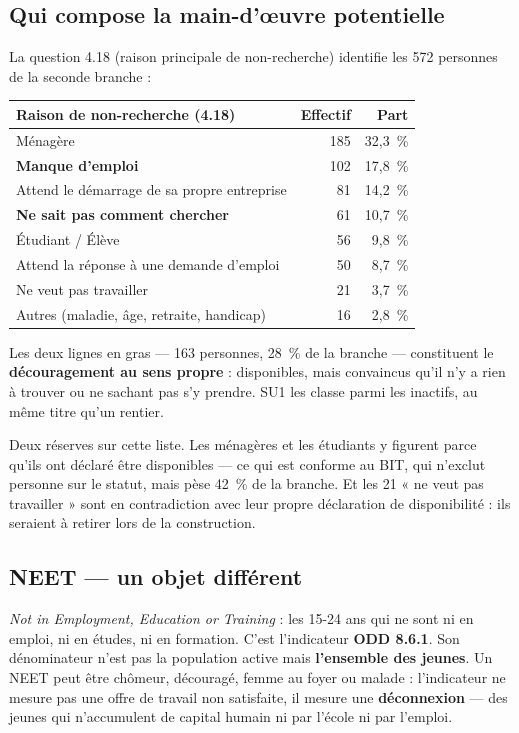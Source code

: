 \documentclass[11pt,a4paper]{article}
\begin{document}
\subsection{Qui compose la main-d'\oe uvre potentielle}

La question 4.18 (raison principale de non-recherche) identifie les 572 personnes de la seconde
branche :

\begin{center}
\small
\begin{tabular}{@{}lrr@{}}
\toprule
\textbf{Raison de non-recherche (4.18)} & \textbf{Effectif} & \textbf{Part} \\
\midrule
Ménagère & 185 & 32,3~\% \\
\textbf{Manque d'emploi} & 102 & 17,8~\% \\
Attend le démarrage de sa propre entreprise & 81 & 14,2~\% \\
\textbf{Ne sait pas comment chercher} & 61 & 10,7~\% \\
Étudiant / Élève & 56 & 9,8~\% \\
Attend la réponse à une demande d'emploi & 50 & 8,7~\% \\
Ne veut pas travailler & 21 & 3,7~\% \\
Autres (maladie, âge, retraite, handicap) & 16 & 2,8~\% \\
\bottomrule
\end{tabular}
\end{center}

Les deux lignes en gras --- 163 personnes, 28~\% de la branche --- constituent le
\textbf{découragement au sens propre} : disponibles, mais convaincus qu'il n'y a rien à trouver ou
ne sachant pas s'y prendre. SU1 les classe parmi les inactifs, au même titre qu'un rentier.

Deux réserves sur cette liste. Les ménagères et les étudiants y figurent parce qu'ils ont déclaré
être disponibles --- ce qui est conforme au BIT, qui n'exclut personne sur le statut, mais pèse
42~\% de la branche. Et les 21 « ne veut pas travailler » sont en contradiction avec leur propre
déclaration de disponibilité : ils seraient à retirer lors de la construction.

\subsection{NEET --- un objet différent}

\emph{Not in Employment, Education or Training} : les 15-24 ans qui ne sont ni en emploi, ni en
études, ni en formation. C'est l'indicateur \textbf{ODD 8.6.1}. Son dénominateur n'est pas la
population active mais \textbf{l'ensemble des jeunes}. Un NEET peut être chômeur, découragé,
femme au foyer ou malade : l'indicateur ne mesure pas une offre de travail non satisfaite, il
mesure une \textbf{déconnexion} --- des jeunes qui n'accumulent de capital humain ni par l'école
ni par l'emploi.
\end{document}
